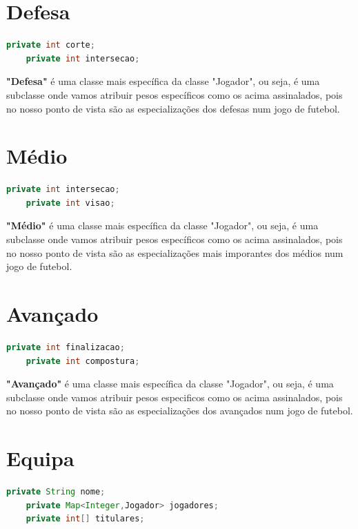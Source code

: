 \documentclass[a4paper]{report}
\begin{document}
	\newpage
	
	\section{Defesa}
	\begin{lstlisting}[language=Java]
    private int corte;
    private int intersecao;
	\end{lstlisting}
	
	\textbf{"Defesa"} é uma classe mais específica da classe "Jogador", ou seja, é uma subclasse onde vamos atribuir pesos específicos como os acima assinalados, pois no nosso ponto de vista são as especializações dos defesas num jogo de futebol.
	



	\section{Médio}
	\begin{lstlisting}[language=Java]
    private int intersecao;
    private int visao;
	\end{lstlisting}
	
	\textbf{"Médio"} é uma classe mais específica da classe "Jogador", ou seja, é uma subclasse onde vamos atribuir pesos específicos como os acima assinalados, pois no nosso ponto de vista são as especializações mais imporantes dos médios num jogo de futebol.
	
	\section{Avançado}
	\begin{lstlisting}[language=Java]
    private int finalizacao;
    private int compostura;
	\end{lstlisting}
	
	\textbf{"Avançado"} é uma classe mais específica da classe "Jogador", ou seja, é uma subclasse onde vamos atribuir pesos especificos como os acima assinalados, pois no nosso ponto de vista são as especializações dos avançados num jogo de futebol.
	
    \section{Equipa}
	\begin{lstlisting}[language=Java]
    private String nome;
    private Map<Integer,Jogador> jogadores;
    private int[] titulares;
	\end{lstlisting}
	
\end{document}
